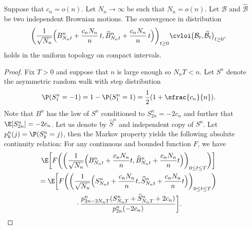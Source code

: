 \begin{lemma}\label{lem:cv_recentre_brownien}
Suppose that $c_n = o(n)$. Let $N_{n}\to \infty$ be such that $N_{n} = o(n)$. Let $\mathcal{B}$ and $\widehat{ \mathcal{B}}$ be two independent Brownian motions.
The convergence in distribution\vspace*{-3pt}\enlargethispage{.5\baselineskip}%
\[
\biggl(\frac{1}{\sqrt{N_{n}}} \Bigl(B^{n}_{N_{n}t}+\frac{c_{n} N_{n}}{n}\,t, \widehat{B}^{n}_{N_{n}t}+\frac{c_{n} N_{n}}{n}\,t\Bigr)\biggr)_{t \ge 0}
\cvloi \bigl(\mathcal{B}_{t}, \widehat{ \mathcal{B}}_{t}\bigr)_{t \ge 0},
\]
holds in the uniform topology on compact intervals.
\end{lemma}

\begin{proof}
Fix $T>0$ and suppose that $n$ is large enough so $N_n T < n$. Let $S^{n}$ denote the asymmetric random walk with step distribution\vspace*{-3pt}
\[
\P(S^{n}_{1} = -1) = 1-\P(S^{n}_{1} = 1) = \frac{1}{2}(1+\sfrac{c_{n}}{n}).
\]
Note that $B^{n}$ has the law of $S^{n}$ conditioned to $S^n_{2n} = -2c_{n}$ and further that $\E[S^{n}_{2n}] = -2c_{n}$. Let us denote by $\widehat{S}^{n}$ and independent copy of $S^{n}$.
Let $p^n_k(j) = \P(S^n_k = j)$, then the Markov property yields the following absolute continuity relation: For any continuous and bounded function $F$, we have\vspace*{-5pt}
\begin{multline*}
\E\biggl[F\biggl(\biggl(\frac{1}{\sqrt{N_{n}}} \Bigl(B^{n}_{N_{n}t}+\frac{c_{n} N_{n}}{n}t, \widehat{B}^{n}_{N_{n}t}+\frac{c_{n} N_{n}}{n}t\Bigr)\biggr)_{0 \le t \le T}\biggr) \biggr]
\\
= \E\biggl[F\biggl(\biggl(\frac{1}{\sqrt{N_{n}}} \Bigl(S^{n}_{N_{n}t}+\frac{c_{n} N_{n}}{n}t, \widehat{S}^{n}_{N_{n}t}+\frac{c_{n} N_{n}}{n}t\Bigr)\biggr)_{0 \le t \le T}\biggr)\\
{}\cdot\frac{p^n_{2n-2N_{n}T}(S^{n}_{N_{n}T}+\widehat{S}^{n}_{N_{n}T}+2c_{n})}{p^n_{2n}(-2c_{n})}\biggr].
\end{multline*}


\end{proof}
